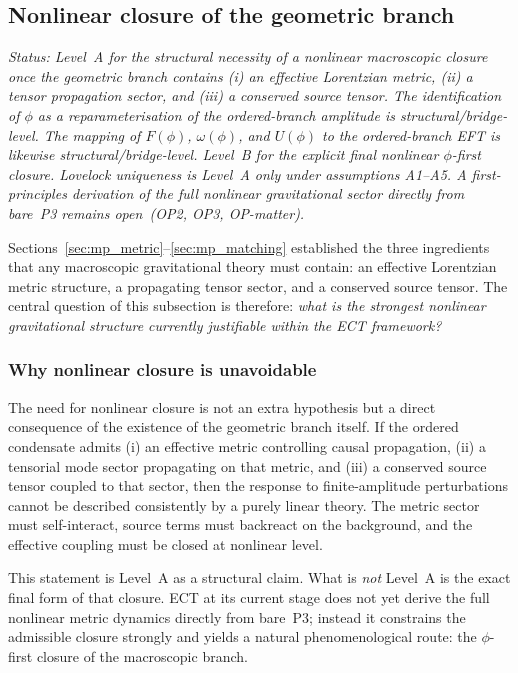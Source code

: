 \documentclass[11pt,a4paper]{article}
\numberwithin{equation}{section}
\begin{document}
\subsection{Nonlinear closure of the geometric branch}
\label{sec:mp_nonlinear}

\textit{Status: Level~A for the structural necessity of a nonlinear
macroscopic closure once the geometric branch contains
(i) an effective Lorentzian metric, (ii) a tensor propagation sector,
and (iii) a conserved source tensor.
The identification of $\phi$ as a reparameterisation of the
ordered-branch amplitude is structural/bridge-level.
The mapping of $F(\phi)$, $\omega(\phi)$, and $U(\phi)$ to the
ordered-branch EFT is likewise structural/bridge-level.
Level~B for the explicit final nonlinear $\phi$-first closure.
Lovelock uniqueness is Level~A only under assumptions A1--A5.
A first-principles derivation of the full nonlinear gravitational
sector directly from bare~P3 remains open~(OP2, OP3, OP-matter).}

\medskip
Sections~\ref{sec:mp_metric}--\ref{sec:mp_matching} established the
three ingredients that any macroscopic gravitational theory must
contain: an effective Lorentzian metric structure, a propagating tensor
sector, and a conserved source tensor.
The central question of this subsection is therefore:
\emph{what is the strongest nonlinear gravitational structure currently
justifiable within the ECT framework?}

\subsubsection*{Why nonlinear closure is unavoidable}

The need for nonlinear closure is not an extra hypothesis but a direct
consequence of the existence of the geometric branch itself.
If the ordered condensate admits (i) an effective metric controlling
causal propagation, (ii) a tensorial mode sector propagating on that
metric, and (iii) a conserved source tensor coupled to that sector,
then the response to finite-amplitude perturbations cannot be described
consistently by a purely linear theory.
The metric sector must self-interact, source terms must backreact on the
background, and the effective coupling must be closed at nonlinear level.

This statement is Level~A as a structural claim.
What is \emph{not} Level~A is the exact final form of that closure.
ECT at its current stage does not yet derive the full nonlinear metric
dynamics directly from bare~P3; instead it constrains the admissible
closure strongly and yields a natural phenomenological route:
the $\phi$-first closure of the macroscopic branch.
\end{document}
